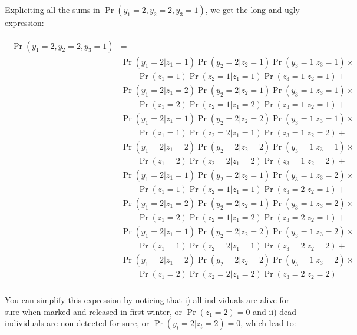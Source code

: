 \documentclass[
  12pt,
]{krantz}
\begin{document}
Expliciting all the sums in \(\Pr(y_1 = 2, y_2 = 2, y_3 = 1)\), we get the long and ugly expression:

\begin{align*}
\begin{split}
\Pr(y_1 = 2, y_2 = 2, y_3 = 1) &= \\
& \Pr(y_1 = 2 | z_1 = 1) \Pr(y_2 = 2 | z_2 = 1) \Pr(y_3 = 1 | z_3 = 1) \times \\ 
& \qquad \Pr(z_1 = 1) \Pr(z_2 = 1 | z_1 = 1) \Pr(z_3 = 1 | z_2 = 1) +\\
&  \Pr(y_1 = 2 | z_1 = 2) \Pr(y_2 = 2 | z_2 = 1) \Pr(y_3 = 1 | z_3 = 1) \times\\ 
& \qquad \Pr(z_1 = 2) \Pr(z_2 = 1 | z_1 = 2) \Pr(z_3 = 1 | z_2 = 1) +\\
&  \Pr(y_1 = 2 | z_1 = 1) \Pr(y_2 = 2 | z_2 = 2) \Pr(y_3 = 1 | z_3 = 1) \times\\ 
& \qquad \Pr(z_1 = 1) \Pr(z_2 = 2 | z_1 = 1) \Pr(z_3 = 1 | z_2 = 2) +\\
&  \Pr(y_1 = 2 | z_1 = 2) \Pr(y_2 = 2 | z_2 = 2) \Pr(y_3 = 1 | z_3 = 1) \times\\ 
& \qquad \Pr(z_1 = 2) \Pr(z_2 = 2 | z_1 = 2) \Pr(z_3 = 1 | z_2 = 2) +\\
&  \Pr(y_1 = 2 | z_1 = 1) \Pr(y_2 = 2 | z_2 = 1) \Pr(y_3 = 1 | z_3 = 2) \times\\ 
& \qquad \Pr(z_1 = 1) \Pr(z_2 = 1 | z_1 = 1) \Pr(z_3 = 2 | z_2 = 1) +\\
&  \Pr(y_1 = 2 | z_1 = 2) \Pr(y_2 = 2 | z_2 = 1) \Pr(y_3 = 1 | z_3 = 2) \times\\ 
& \qquad \Pr(z_1 = 2) \Pr(z_2 = 1 | z_1 = 2) \Pr(z_3 = 2 | z_2 = 1) +\\
&  \Pr(y_1 = 2 | z_1 = 1) \Pr(y_2 = 2 | z_2 = 2) \Pr(y_3 = 1 | z_3 = 2) \times\\ 
& \qquad \Pr(z_1 = 1) \Pr(z_2 = 2 | z_1 = 1) \Pr(z_3 = 2 | z_2 = 2) +\\
&  \Pr(y_1 = 2 | z_1 = 2) \Pr(y_2 = 2 | z_2 = 2) \Pr(y_3 = 1 | z_3 = 2) \times\\ 
& \qquad \Pr(z_1 = 2) \Pr(z_2 = 2 | z_1 = 2) \Pr(z_3 = 2 | z_2 = 2)\\
\end{split}
\end{align*}

You can simplify this expression by noticing that i) all individuals are alive for sure when marked and released in first winter, or \(\Pr(z_1=2) = 0\) and ii) dead individuals are non-detected for sure, or \(\Pr(y_t = 2|z_t = 2) = 0\), which lead to:
\end{document}
